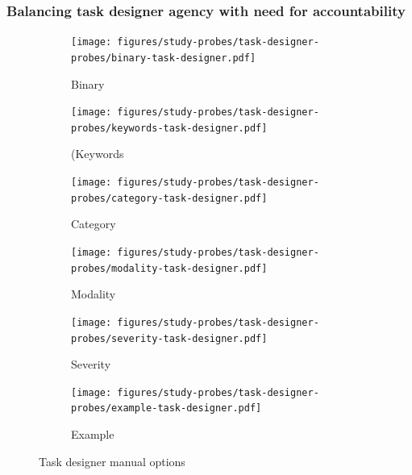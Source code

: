 \subsubsection{Balancing task designer agency with
need for accountability}
\begin{figure}[htbp]
    \centering

    \begin{subfigure}[b]{0.5\textwidth}
        \centering
        \texttt{[image: figures/study-probes/task-designer-probes/binary-task-designer.pdf]}
        \caption{Binary}
        \label{fig:manual-binary}
    \end{subfigure}
    \hfill
    \begin{subfigure}[b]{0.48\textwidth}
        \centering
        \texttt{[image: figures/study-probes/task-designer-probes/keywords-task-designer.pdf]}
        \caption{(Keywords}
        \label{fig:manual-keywords}
    \end{subfigure}

    \vspace{0.5em}

    \begin{subfigure}[b]{0.48\textwidth}
        \centering
        \texttt{[image: figures/study-probes/task-designer-probes/category-task-designer.pdf]}
        \caption{Category}
        \label{fig:manual-category}
    \end{subfigure}
    \hfill
    \begin{subfigure}[b]{0.48\textwidth}
        \centering
        \texttt{[image: figures/study-probes/task-designer-probes/modality-task-designer.pdf]}
        \caption{Modality}
        \label{fig:manual-modality}
    \end{subfigure}

    \vspace{0.5em}

    \begin{subfigure}[b]{0.48\textwidth}
        \centering
        \texttt{[image: figures/study-probes/task-designer-probes/severity-task-designer.pdf]}
        \caption{Severity}
        \label{fig:manual-severity}
    \end{subfigure}
    \hfill
    \begin{subfigure}[b]{0.48\textwidth}
        \centering
        \texttt{[image: figures/study-probes/task-designer-probes/example-task-designer.pdf]}
        \caption{Example}
        \label{fig:manual-example}
    \end{subfigure}
    \caption{Task designer manual options}
    \label{fig:task-designer-manual}
\end{figure}


